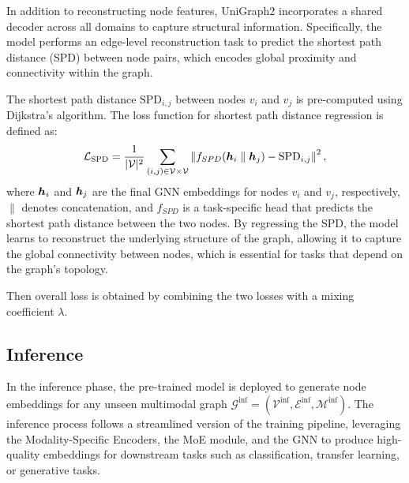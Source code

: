 
 In addition to reconstructing node features, UniGraph2 incorporates a shared decoder across all domains to capture structural information. Specifically, the model performs an edge-level reconstruction task to predict the shortest path distance (SPD) between node pairs, which encodes global proximity and connectivity within the graph.

The shortest path distance \( \text{SPD}_{i,j} \) between nodes \( v_i \) and \( v_j \) is pre-computed using Dijkstra's algorithm. The loss function for shortest path distance regression is defined as:
\begin{equation} 
    \mathcal{L}_{\text{SPD}} = \frac{1}{|\mathcal{V}|^2} \sum_{(i,j) \in \mathcal{V} \times \mathcal{V}} \left\| f_{SPD} ({\bm{h}}_i \parallel {\bm{h}}_j) - \text{SPD}_{i,j} \right\|^2, 
    \end{equation}
where \( {\bm{h}}_i \) and \( {\bm{h}}_j \) are the final GNN embeddings for nodes \( v_i \) and \( v_j \), respectively, \( \parallel \) denotes concatenation, and \( f_{SPD} \) is a task-specific head that predicts the shortest path distance between the two nodes.
By regressing the SPD, the model learns to reconstruct the underlying structure of the graph, allowing it to capture the global connectivity between nodes, which is essential for tasks that depend on the graph's topology.

Then overall loss is obtained by combining the two losses with a mixing coefficient $\lambda$.

\vspace{-1mm}
\subsection{Inference}
In the inference phase, the pre-trained \model model is deployed to generate node embeddings for any unseen multimodal graph \( \mathcal{G}^{\text{inf}} = (\mathcal{V}^{\text{inf}}, \mathcal{E}^{\text{inf}}, \mathcal{M}^{\text{inf}}) \). The inference process follows a streamlined version of the training pipeline, leveraging the Modality-Specific Encoders, the MoE module, and the GNN to produce high-quality embeddings for downstream tasks such as classification, transfer learning, or generative tasks.

